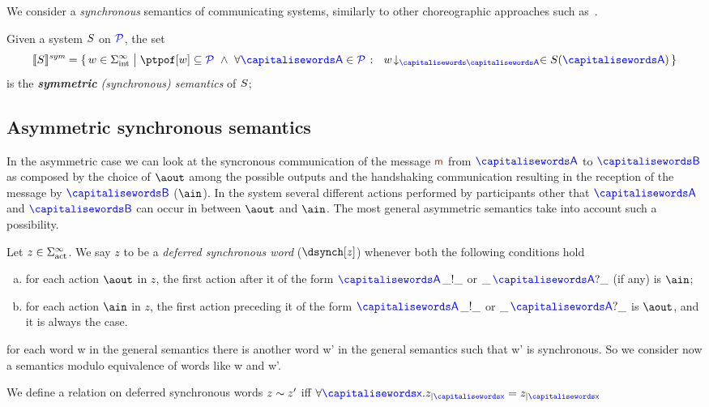 We consider a \emph{synchronous} semantics of
communicating systems, similarly to other choreographic approaches
such as~\cite{BravettiZ07,CarboneHY12,Dezani-Ciancaglini16,SeveriD19}.

\begin{definition}\label{def:syncSem}
  Given a system $S$ on $\mathcal{\color{blue}{P}}$, the set
  \[
	 \ssem{\aCS} = \Set{\acword \in \alfint^\infty \sst  \ptpof[\acword] \subseteq \ptpset \ \land\ \forall \p \in
		\ptpset \qst \ \proj{\acword}{\p} \in \aCS(\p)}
  \]
  is the \emph{{\bf symmetric} (synchronous) semantics} of $S$;
\end{definition}

\subsection{Asymmetric synchronous semantics}

In the asymmetric case we can look at the syncronous communication of the message $\msg$
from $\p$ to $\q$ as composed by the choice of $\aout$ among the possible outputs and the
handshaking communication resulting in the reception of the message by $\q$ ($\ain$).
In the system several different actions performed by participants other that $\p$ and $\q$
can occur in between $\aout$ and $\ain$. The most general asymmetric semantics take into account
such a possibility. 
 

\begin{definition}
Let $z\in\Sigma_{\text{act}}^{\infty}$. We say $z$ to be a {\em deferred synchronous word} ($\dsynch[z]$) whenever both the following conditions hold
\begin{enumerate}[a)]
\item 
for each action $\aout$ in $z$, the first action after it of the form $\p\,\_!\_$ or  $\_\,\p?\_$ (if any) is $\ain$;
\item
for each action $\ain$ in $z$, the first action preceding it of the form $\p\,\_!\_$ or  $\_\,\p?\_$ is $\aout$, and it is always the case.
\end{enumerate}
\end{definition}


for each word w in the general semantics there is another word w' in the general semantics
such that w' is synchronous.
So we consider now a semantics modulo equivalence of words like w and w'.

We define a relation on deferred synchronous words 
$z\sim z'$ iff $\forall \px. \filter{z}{\px}=\filter{z}{\px}$

